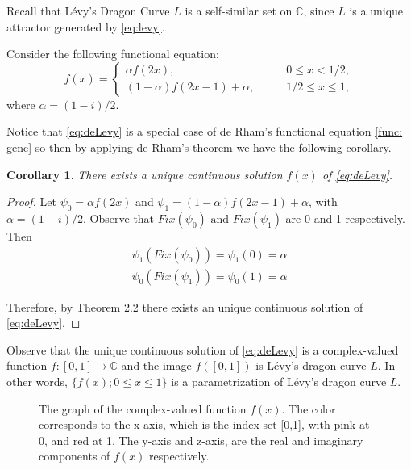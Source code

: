 \documentclass[epsf,10pt]{article}
\newtheorem{corollary}[theorem]{Corollary}
\begin{document}
Recall that L\'evy's Dragon Curve $L$ is a self-similar set on $\mathbb{C}$, since $L$ is a unique attractor generated by \eqref{eq:levy}.

Consider the following functional equation:
\begin{equation}
    \label{eq:deLevy}
        f(x)=
        \begin{cases}
                \alpha f(2x),
                        & \qquad 0 \leq x < 1/2, \\
                (1-\alpha) f(2x-1)+\alpha,
                        & \qquad 1/2 \leq x \leq 1,
       \end{cases}
\end{equation}
where $\alpha=(1-i)/2$.

Notice that \eqref{eq:deLevy} is a special case of de Rham's functional equation \eqref{func: gene} so then by applying de Rham's theorem we have the following corollary.

\begin{corollary}
There exists a unique continuous solution $f(x)$ of \eqref{eq:deLevy}.
\end{corollary}
\begin{proof}
Let $\psi_0 = \alpha f(2x)$ and $\psi_1 =(1-\alpha) f(2x-1)+\alpha$, with $\alpha = (1-i)/2$. Observe that $Fix (\psi_0)\text{ and } Fix (\psi_1)$ are 0 and 1 respectively. Then 
\begin{align*}
    \psi_{1}(Fix (\psi_0)) = \psi_1(0)=\alpha \\
    \psi_{0}(Fix(\psi_1))=\psi_0(1) =\alpha
\end{align*}


Therefore, by Theorem 2.2 there exists an unique continuous solution of \eqref{eq:deLevy}.
\end{proof}

Observe that the unique continuous solution of \eqref{eq:deLevy} is a complex-valued function $f: [0,1]\to \mathbb{C}$ and the image $f([0,1])$ is L\'evy's dragon curve $L$. In other words, $\{f(x);0\leq x \leq 1\}$ is a parametrization of L\'evy's dragon curve $L$.  



\begin{figure}[H]
  	\begin{center}
	\end{center}
     \caption{The graph of the complex-valued function $f(x)$. The color corresponds to the x-axis, which is the index set [0,1], with pink at 0, and red at 1. The y-axis and z-axis, are the real and imaginary components of $f(x)$ respectively.}
    \label{fig:3D-fractal}
\end{figure}
\end{document}
